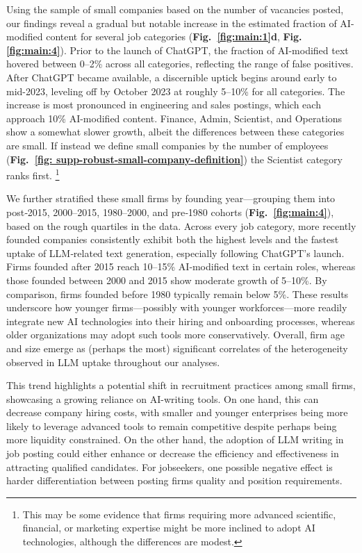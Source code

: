 Using the sample of small companies based on the number of vacancies posted, our findings reveal a gradual but notable increase in the estimated fraction of AI-modified content for several job categories (\textbf{Fig.~\ref{fig:main:1}d}, \textbf{Fig. \ref{fig:main:4}}). Prior to the launch of ChatGPT, the fraction of AI-modified text hovered between 0–2\% across all categories, reflecting the range of false positives. After ChatGPT became available, a discernible uptick begins around early to mid-2023, leveling off by October 2023 at roughly 5–10\% for all categories. The increase is most pronounced in engineering and sales postings, which each approach 10\% AI-modified content. Finance, Admin, Scientist, and Operations show a somewhat slower growth, albeit the differences between these categories are small. If instead we define small companies by the number of employees (\textbf{Fig.~\ref{fig: supp-robust-small-company-definition}}) the Scientist category ranks first. \footnote{This may be some evidence that firms requiring more advanced scientific, financial, or marketing expertise might be more inclined to adopt AI technologies, although the differences are modest.}



We further stratified these small firms by founding year—grouping them into post‐2015, 2000–2015, 1980–2000, and pre‐1980 cohorts (\textbf{Fig.\ \ref{fig:main:4}}), based on the rough quartiles in the data. Across every job category, more recently founded companies consistently exhibit both the highest levels and the fastest uptake of LLM‐related text generation, especially following ChatGPT’s launch. Firms founded after 2015 reach 10–15\% AI‐modified text in certain roles, whereas those founded between 2000 and 2015 show moderate growth of 5–10\%. By comparison, firms founded before 1980 typically remain below 5\%. These results underscore how younger firms—possibly with younger workforces—more readily integrate new AI technologies into their hiring and onboarding processes, whereas older organizations may adopt such tools more conservatively. Overall, firm age and size emerge as (perhaps the most) significant correlates of the heterogeneity observed in LLM uptake throughout our analyses. 


This trend highlights a potential shift in recruitment practices among small firms, showcasing a growing reliance on AI-writing tools. On one hand, this can decrease company hiring costs, with smaller and younger enterprises being more likely to leverage advanced tools to remain competitive despite perhaps being more liquidity constrained. On the other hand, the adoption of LLM writing in job posting could either enhance or decrease the efficiency and effectiveness in attracting qualified candidates. For jobseekers, one possible negative effect is harder differentiation between posting firms quality and position requirements.

